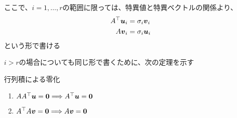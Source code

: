 \documentclass[../../../topic_linear-algebra]{subfiles}
\begin{document}
\br

ここで、$i = 1,\ldots,r$の範囲に限っては、特異値と特異ベクトルの関係より、
\begin{align*}
  A^\top \vb*{u}_i & = \sigma_i \vb*{v}_i \\
  A\vb*{v}_i       & = \sigma_i \vb*{u}_i
\end{align*}
という形で書ける

$i >r$の場合についても同じ形で書くために、次の定理を示す

\begin{theorem}{行列積による零化}
  \begin{enumerate}[label=\romanlabel]
    \item $AA^\top \vb*{u} = \vb*{0} \Longrightarrow A^\top \vb*{u} = \vb*{0}$
    \item $A^\top A \vb*{v} = \vb*{0} \Longrightarrow A\vb*{v} = \vb*{0}$
  \end{enumerate}
\end{theorem}
\end{document}
